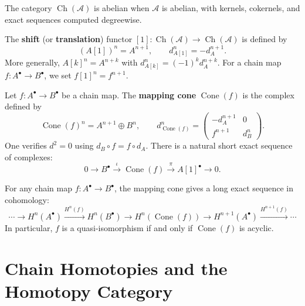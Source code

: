 \begin{remark}\label{rem:ch-abelian}
The category $\operatorname{Ch}(\mathcal{A})$ is abelian when $\mathcal{A}$ is abelian,
with kernels, cokernels, and exact sequences computed degreewise.
\end{remark}

\begin{definition}\label{def:shift-functor}
The \textbf{shift} (or \textbf{translation}) functor $[1] \colon \operatorname{Ch}(\mathcal{A})
\to \operatorname{Ch}(\mathcal{A})$ is defined by
\[
    (A[1])^n = A^{n+1}, \qquad d_{A[1]}^n = -d_A^{n+1}.
\]
More generally, $A[k]^n = A^{n+k}$ with $d_{A[k]}^n = (-1)^k d_A^{n+k}$.
For a chain map $f \colon A^\bullet \to B^\bullet$, we set $f[1]^n = f^{n+1}$.
\end{definition}

\begin{definition}\label{def:mapping-cone}
Let $f \colon A^\bullet \to B^\bullet$ be a chain map. The \textbf{mapping cone}
$\operatorname{Cone}(f)$ is the complex defined by
\[
    \operatorname{Cone}(f)^n = A^{n+1} \oplus B^n, \qquad
    d_{\operatorname{Cone}(f)}^n = \begin{pmatrix} -d_A^{n+1} & 0 \\ f^{n+1} & d_B^n \end{pmatrix}.
\]
One verifies $d^2 = 0$ using $d_B \circ f = f \circ d_A$.
There is a natural short exact sequence of complexes:
\[
    0 \longrightarrow B^\bullet \xrightarrow{\;\iota\;} \operatorname{Cone}(f)
    \xrightarrow{\;\pi\;} A[1]^\bullet \longrightarrow 0.
\]
\end{definition}

\begin{proposition}\label{prop:cone-les}
For any chain map $f \colon A^\bullet \to B^\bullet$, the mapping cone gives a long exact
sequence in cohomology:
\[
    \cdots \to H^n(A^\bullet) \xrightarrow{H^n(f)} H^n(B^\bullet) \to
    H^n(\operatorname{Cone}(f)) \to H^{n+1}(A^\bullet) \xrightarrow{H^{n+1}(f)} \cdots
\]
In particular, $f$ is a quasi-isomorphism if and only if $\operatorname{Cone}(f)$ is acyclic.
\end{proposition}


\section{Chain Homotopies and the Homotopy Category}\label{sec:homotopy-cat}

